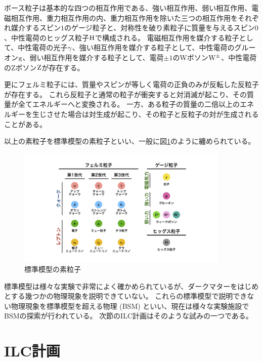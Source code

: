 ボース粒子は基本的な四つの相互作用である、強い相互作用、弱い相互作用、電磁相互作用、重力相互作用の内、重力相互作用を除いた三つの相互作用をそれぞれ媒介するスピン$1$のゲージ粒子と、対称性を破り素粒子に質量を与えるスピン$0$、中性電荷のヒッグス粒子$\rm H$で構成される。
電磁相互作用を媒介する粒子として、中性電荷の光子$\rm \gamma$、強い相互作用を媒介する粒子として、中性電荷のグルーオン$\rm g$、弱い相互作用を媒介する粒子として、電荷$\pm 1$のWボソン$\rm W^{\pm}$、中性電荷のZボソン$\rm Z$が存在する。

更にフェルミ粒子には、質量やスピンが等しく電荷の正負のみが反転した反粒子が存在する。
これら反粒子と通常の粒子が衝突すると対消滅が起こり、その質量が全てエネルギーへと変換される。
一方、ある粒子の質量の二倍以上のエネルギーを生じさせた場合は対生成が起こり、その粒子と反粒子の対が生成されることがある。

以上の素粒子を標準模型の素粒子といい、一般に図\ref{1SMParticle}のように纏められている。

\begin{figure}[htbp]
 \centering
 \includegraphics[width=0.9\textwidth]{Figure/1Introduction/1SMParticle.png}
 \caption{標準模型の素粒子}
 \label{1SMParticle}
\end{figure}

標準模型は様々な実験で非常によく確かめられているが、ダークマターをはじめとする幾つかの物理現象を説明できていない。
これらの標準模型で説明できない物理現象を標準模型を超える物理 (BSM) といい、現在は様々な実験施設でBSMの探索が行われている。
次節のILC計画はそのような試みの一つである。


\section{ILC計画} \label{Intro:InternationalLinearColliderProject}

